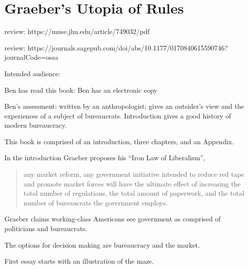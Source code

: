 \section{Graeber's Utopia of Rules\label{review:graeber_utopia}}

\cite{2015_Graeber}

review: https://muse.jhu.edu/article/749032/pdf

review: https://journals.sagepub.com/doi/abs/10.1177/0170840615590746?journalCode=ossa


Intended audience:

Ben has read this book: Ben has an electronic copy

Ben's assessment: written by an anthropologist; gives an outsider's view and the experiences of a subject of bureaucrats. Introduction gives a good history of modern bureaucracy.


This book is comprised of an introduction, three chapters, and an Appendix. 

In the introduction Graeber proposes his ``Iron Law of Liberalism'',
\begin{quote}
    any market reform, any government initiative intended to reduce red tape and promote market forces will have the ultimate effect of increasing the total number of regulations, the total amount of paperwork, and the total number of bureaucrats the government employs.
\end{quote}

Graeber claims working-class Americans see government as comprised of politicians and bureaucrats.

The options for decision making are bureaucracy and the market.


First essay starts with an illustration of the maze.